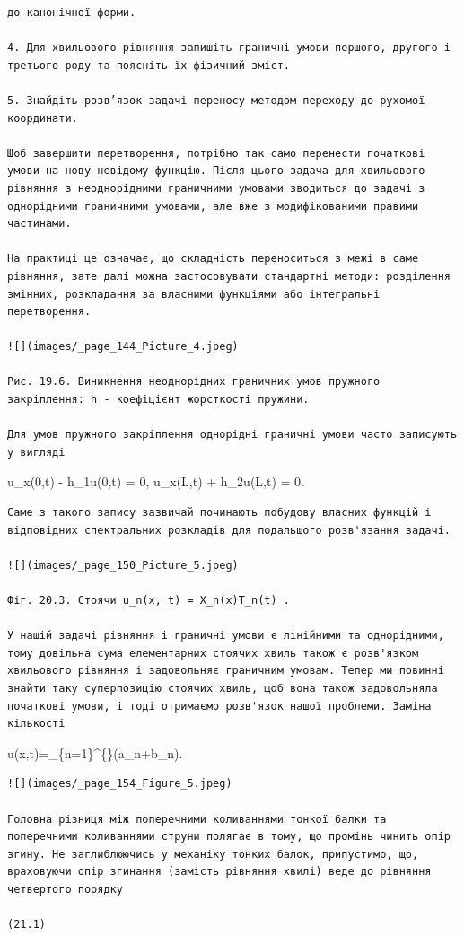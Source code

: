 \documentclass[
  ukrainian,
]{article}
\begin{document}
\begin{verbatim}
до канонічної форми.

4. Для хвильового рівняння запишіть граничні умови першого, другого і третього роду та поясніть їх фізичний зміст.

5. Знайдіть розв’язок задачі переносу методом переходу до рухомої координати.

Щоб завершити перетворення, потрібно так само перенести початкові умови на нову невідому функцію. Після цього задача для хвильового рівняння з неоднорідними граничними умовами зводиться до задачі з однорідними граничними умовами, але вже з модифікованими правими частинами.

На практиці це означає, що складність переноситься з межі в саме рівняння, зате далі можна застосовувати стандартні методи: розділення змінних, розкладання за власними функціями або інтегральні перетворення.

![](images/_page_144_Picture_4.jpeg)

Рис. 19.6. Виникнення неоднорідних граничних умов пружного закріплення: h - коефіцієнт жорсткості пружини.

Для умов пружного закріплення однорідні граничні умови часто записують у вигляді
\end{verbatim}

u\_x(0,t) - h\_1u(0,t) = 0, \qquad u\_x(L,t) + h\_2u(L,t) = 0.

\begin{verbatim}
Саме з такого запису зазвичай починають побудову власних функцій і відповідних спектральних розкладів для подальшого розв'язання задачі.

![](images/_page_150_Picture_5.jpeg)

Фіг. 20.3. Стоячи u_n(x, t) = X_n(x)T_n(t) .

У нашій задачі рівняння і граничні умови є лінійними та однорідними, тому довільна сума елементарних стоячих хвиль також є розв'язком хвильового рівняння і задовольняє граничним умовам. Тепер ми повинні знайти таку суперпозицію стоячих хвиль, щоб вона також задовольняла початкові умови, і тоді отримаємо розв'язок нашої проблеми. Заміна кількості
\end{verbatim}

u(x,t)=\sum\_\{n=1\}\^{}\{\infty\}\left(a\_n\sin{}+b\_n\cos{}\right)\sin{}.

\begin{verbatim}
![](images/_page_154_Figure_5.jpeg)

Головна різниця між поперечними коливаннями тонкої балки та поперечними коливаннями струни полягає в тому, що промінь чинить опір згину. Не заглиблюючись у механіку тонких балок, припустимо, що, враховуючи опір згинання (замість рівняння хвилі) веде до рівняння четвертого порядку

(21.1)
\end{verbatim}
\end{document}
